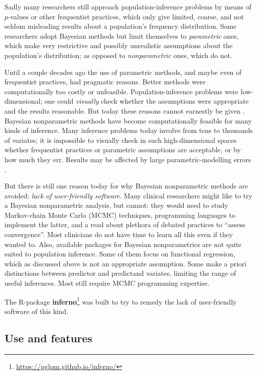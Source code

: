 Sadly many researchers still approach population-inference problems by means of $p$-values or other frequentist practices, which only give limited, coarse, and not seldom misleading results about a population's frequency distribution. Some researchers adopt Bayesian methods but limit themselves to \emph{parametric} ones, which make very restrictive and possibly unrealistic assumptions about the population's distribution; as opposed to \emph{nonparametric} ones, which do not.

Until a couple decades ago the use of parametric methods, and maybe even of frequentist practices, had pragmatic reasons. Better methods were computationally too costly or unfeasible. Population-inference problems were low-dimensional; one could \emph{visually} check whether the assumptions were appropriate and the results reasonable. But today these reasons cannot earnestly be given \citep{walker2010}. Bayesian nonparametric methods have become computationally feasible for many kinds of inference. Many inference problems today involve from tens to thousands of variates; it is impossible to visually check in such high-dimensional spaces whether frequentist practices or parametric assumptions are acceptable, or by how much they err. Results may be affected by large parametric-modelling errors \citep{draper1995}.

But there is still one reason today for why Bayesian nonparametric methods are avoided: \emph{lack of user-friendly software}. Many clinical researchers might like to try a Bayesian nonparametric analysis, but cannot: they would need to study Markov-chain Monte Carlo (MCMC) techniques, programming languages to implement the latter, and a read about plethora of debated practices to ``assess convergence''. Most clinicians do not have time to learn all this even if they wanted to. Also, available packages for Bayesian nonparametrics are not quite suited to population inference. Some of them focus on functional regression, which as discussed above is not an appropriate assumption. Some make a priori distinctions between predictor and predictand variates, limiting the range of useful inferences. Most still require MCMC programming expertise.

The R-package \textbf{inferno}\footnote{\url{https://pglpm.github.io/inferno/}} was built to try to remedy the lack of user-friendly software of this kind.

\subsection*{Use and features}
\label{sec:features}

